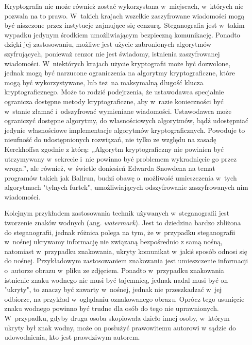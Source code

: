 \documentclass[a4paper, twoside, 12pt]{report}
\begin{document}
        Kryptografia nie może również zostać wykorzystana w~miejscach, w~których
        nie pozwala na to prawo\cite{CRYPTOGRAFYLAW}. W~takich krajach wszelkie
        zaszyfrowane wiadomości mogą być niszczone przez instytucje zajmujące się
        cenzurą. Steganografia jest w~takim
        wypadku jedynym środkiem umożliwiającym bezpieczną komunikację. Ponadto
        dzięki jej zastosowaniu, możliwe jest użycie zabronionych algorytmów szyfrujących,
        ponieważ cenzor nie jest świadomy, istnienia zaszyfrowanej wiadomości.
        W~niektórych krajach użycie kryptografii
        może być dozwolone, jednak mogą być narzucone ograniczenia na algorytmy
        kryptograficzne, które mogą być wykorzystywane, lub też na maksymalną
        długość klucza kryptograficznego. Może to rodzić podejrzenia, że ustawodawca
        specjalnie ogranicza dostępne metody kryptograficzne, aby w~razie konieczności
        być w~stanie złamać i~odszyfrować wymieniane wiadomości. Ustawodawca
        może ograniczyć dostępne algorytmy, do własnościowych algorytmów, bądź
        udostępniać jedynie własnościowe implementacje algorytmów kryptograficznych.
        Powoduje to nieufność do udostępnionych rozwiązań, nie tylko ze względu
        na zasadę Kerckhoffsa zgodnie z którą:
        ,,Algorytm kryptograficzny nie powinien być utrzymywany w~sekrecie i~nie powinno
        być problemem wykradnięcie go przez wroga.''\cite{KERCKHOS}, ale również,
        w~świetle doniesień Edwarda Snowdena na temat programów takich jak
        Ballrun\cite{WIKI:BALLRUN}, budzi obawę o~możliwość umieszczenia w~tych
        algorytmach "tylnych furtek", umożliwiających odszyfrowanie zaszyfrowanych
        nim wiadomości.

        Kolejnym przykładem zastosowania technik używanych w~steganografii jest
        tworzenie znaków wodnych (ang. \emph{watermark}). Jest to dziedzina bardzo zbliżona do steganografii,
        jednak różnica polega na tym, że w~przypadku steganografii w~nośnej ukrywamy
        informację nie związaną bezpośrednio z samą nośną, natomiast w~przypadku znakowania,
        ukryty komunikat w~jakiś sposób odnosi się do nośnej. Przykładowym zastosowaniem
        znakowania jest umieszczenie informacji o~autorze obrazu w~pliku ze zdjęciem.
        Ponadto w~przypadku znakowania istnienie znaku wodnego nie musi być tajemnicą,
        jednak nadal musi być on "ukryty", to znaczy być zawarty w~nośnej, jednak
        nie przeszkadzać w~jej odbiorze, na przykład w~oglądaniu oznakowanego obrazu.
        Oprócz tego usunięcie znaku wodnego powinno być trudne dla osób do tego nie
        uprawnionych. W~przypadku, gdyby druga osoba skopiowała dzieło innej osoby,
        w~którym ukryty był znak wodny, może on posłużyć prawowitemu autorowi w
        sądzie do udowodnienia, kto jest prawdziwym autorem.
\end{document}

